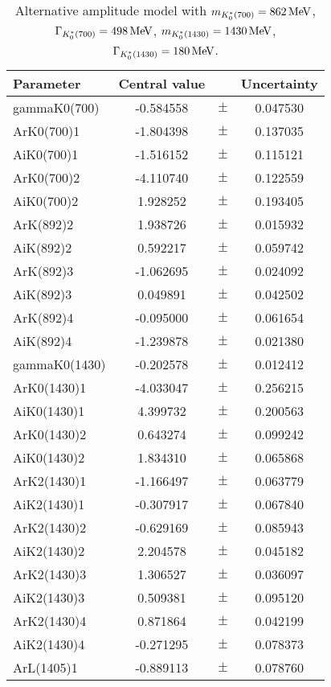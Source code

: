 \clearpage

\begin{table}
\centering
\caption{Alternative amplitude model with $m_{K^*_0(700)} = 862 \text{\,Me\kern -0.1em V}$, $\Gamma_{K^*_0(700)} = 498 \text{\,Me\kern -0.1em V}$, $m_{K^*_0(1430)} = 1430 \text{\,Me\kern -0.1em V}$, $\Gamma_{K^*_0(1430)} = 180 \text{\,Me\kern -0.1em V}$.}
\begin{tiny}
\begin{tabular}{lccc}
\toprule
Parameter & Central value & & Uncertainty\\
\midrule
gammaK0(700) & -0.584558 & $\pm$ & 0.047530 \\
ArK0(700)1 & -1.804398 & $\pm$ & 0.137035 \\
AiK0(700)1 & -1.516152 & $\pm$ & 0.115121 \\
ArK0(700)2 & -4.110740 & $\pm$ & 0.122559 \\
AiK0(700)2 & 1.928252 & $\pm$ & 0.193405 \\
ArK(892)2 & 1.938726 & $\pm$ & 0.015932 \\
AiK(892)2 & 0.592217 & $\pm$ & 0.059742 \\
ArK(892)3 & -1.062695 & $\pm$ & 0.024092 \\
AiK(892)3 & 0.049891 & $\pm$ & 0.042502 \\
ArK(892)4 & -0.095000 & $\pm$ & 0.061654 \\
AiK(892)4 & -1.239878 & $\pm$ & 0.021380 \\
gammaK0(1430) & -0.202578 & $\pm$ & 0.012412 \\
ArK0(1430)1 & -4.033047 & $\pm$ & 0.256215 \\
AiK0(1430)1 & 4.399732 & $\pm$ & 0.200563 \\
ArK0(1430)2 & 0.643274 & $\pm$ & 0.099242 \\
AiK0(1430)2 & 1.834310 & $\pm$ & 0.065868 \\
ArK2(1430)1 & -1.166497 & $\pm$ & 0.063779 \\
AiK2(1430)1 & -0.307917 & $\pm$ & 0.067840 \\
ArK2(1430)2 & -0.629169 & $\pm$ & 0.085943 \\
AiK2(1430)2 & 2.204578 & $\pm$ & 0.045182 \\
ArK2(1430)3 & 1.306527 & $\pm$ & 0.036097 \\
AiK2(1430)3 & 0.509381 & $\pm$ & 0.095120 \\
ArK2(1430)4 & 0.871864 & $\pm$ & 0.042199 \\
AiK2(1430)4 & -0.271295 & $\pm$ & 0.078373 \\
ArL(1405)1 & -0.889113 & $\pm$ & 0.078760 \\

\end{tabular}
\end{tiny}
\end{table}
